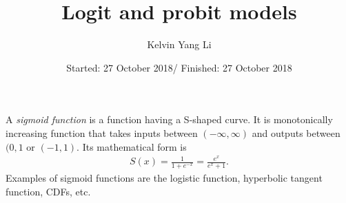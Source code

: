 \makeatletter
\newcommand*{\centernot}{%
  \mathpalette\@centernot
}
\def\@centernot#1#2{%
  \mathrel{%
    \rlap{%
      \settowidth\dimen@{$\m@th#1{#2}$}%
      \kern.5\dimen@
      \settowidth\dimen@{$\m@th#1=$}%
      \kern-.5\dimen@
      $\m@th#1\not$%
    }%
    {#2}%
  }%
}
\makeatother

%
%



\title{Logit and probit models
}


\author{Kelvin Yang Li}



\date{Started: 27 October 2018/ Finished: 27 October 2018}

\maketitle

A \textit{sigmoid function} is a function having a S-shaped curve. It is monotonically increasing function that takes inputs between $(-\infty,\infty)$ and outputs between $(0,1$ or $(-1,1)$. Its mathematical form is 
\begin{align*}
S(x)=\frac{1}{1+e^{-x}}=\frac{e^x}{e^x+1}.
\end{align*}
Examples of sigmoid functions are the logistic function, hyperbolic tangent function, CDFs, etc. 

